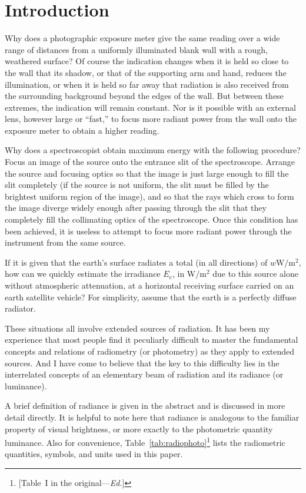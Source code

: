 \section{Introduction}

Why does a photographic exposure meter give the same reading over a wide range
of distances from a uniformly illuminated blank wall with a rough, weathered surface?
Of course the indication changes when it is held so close to the wall that its
shadow,
or that of the supporting arm and hand, reduces the illumination, or when it is
held
so far away that radiation is also received from the surrounding background beyond
the edges of the wall. But between these extremes, the indication will remain
constant.
Nor is it possible with an external lens, however large or “fast,” to focus more radiant
power from the wall onto the exposure meter to obtain a higher reading.

Why does a spectroscopist obtain maximum energy with the following procedure?
Focus an image of the source onto the entrance slit of the spectroscope.
Arrange the source and focusing optics so that the image is just large enough
to fill the slit completely (if the source is not uniform, the slit must be
filled by the brightest uniform region of the image), and so that the
rays which cross to form the image diverge widely enough after passing through
the slit that they completely fill the collimating optics of the
spectroscope. Once this condition has been achieved, it is useless to attempt
to focus more radiant power through the instrument from the same source.

If it is given that the earth's surface radiates a total (in all directions) of
$w\si{\watt\per\square\meter}$, how can we quickly estimate the irradiance
$E_e$,
in $\si{\watt\per\square\meter}$ due to this source alone without atmospheric
attenuation, at a horizontal receiving surface carried on an earth satellite
vehicle?
For simplicity, assume that the earth is a perfectly diffuse radiator.

These situations all involve extended sources of radiation. It has been my experience
that most people find it peculiarly difficult to master the fundamental concepts and
relations of radiometry (or photometry) as they apply to extended sources. And I
have
come to believe that the key to this difficulty lies in the interrelated concepts of an
elementary beam of radiation and its radiance (or luminance).

A brief definition of radiance is given in the abstract and is discussed in more
detail
directly. It is helpful to note here that radiance is analogous to the familiar property
of visual brightness, or more exactly to the photometric quantity luminance.
Also for convenience, Table~\ref{tab:radiophoto}\footnote{[Table~I in the
original---\textit{Ed.}]}
lists the radiometric quantities, symbols, and units used in this paper.

